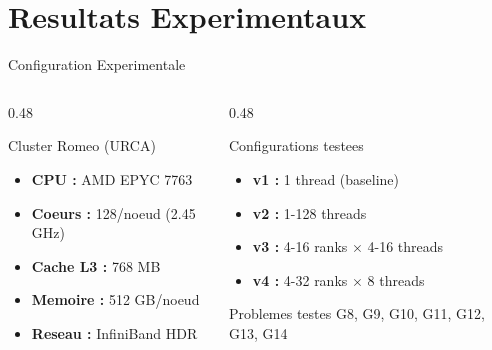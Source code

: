 \documentclass[aspectratio=169,9pt]{beamer}
\begin{document}
\section{Resultats Experimentaux}

\begin{frame}{Configuration Experimentale}
    \begin{columns}[T]
        \begin{column}{0.48\textwidth}
            \begin{block}{Cluster Romeo (URCA)}
                \begin{itemize}\small
                    \item \textbf{CPU :} AMD EPYC 7763
                    \item \textbf{Coeurs :} 128/noeud (2.45 GHz)
                    \item \textbf{Cache L3 :} 768 MB
                    \item \textbf{Memoire :} 512 GB/noeud
                    \item \textbf{Reseau :} InfiniBand HDR
                \end{itemize}
            \end{block}
        \end{column}
        \begin{column}{0.48\textwidth}
            \begin{block}{Configurations testees}
                \begin{itemize}\small
                    \item \textbf{v1 :} 1 thread (baseline)
                    \item \textbf{v2 :} 1-128 threads
                    \item \textbf{v3 :} 4-16 ranks $\times$ 4-16 threads
                    \item \textbf{v4 :} 4-32 ranks $\times$ 8 threads
                \end{itemize}
            \end{block}
            \begin{alertblock}{Problemes testes}
                \small
                G8, G9, G10, G11, G12, G13, G14
            \end{alertblock}
        \end{column}
    \end{columns}
\end{frame}
\end{document}
